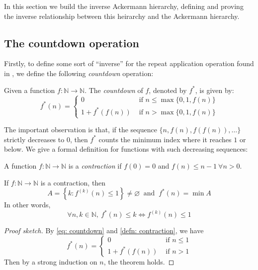 In this section we build the inverse Ackermann hierarchy, 
defining and proving the inverse relationship between 
this heirarchy and the Ackermann hierarchy.

\subsection{The countdown operation}

Firstly, to define some sort of ``inverse'' for the repeat 
application operation found in , we 
define the following \textit{countdown} operation:

\begin{defn} \label{defn: countdown}
Given a function $f: \mathbb{N} \to \mathbb{N}$. 
The \textit{countdown} of $f$, denoted by $f^*$, is given by:
\begin{equation} \label{eq: countdown}
f^*(n) = \begin{cases}
0 & \text{ if } n \le \max\{0, 1, f(n)\} \\ 1 + f^*(f(n)) & \text{ if } n > \max\{0, 1, f(n)\}
\end{cases}
\end{equation}
\end{defn}
The important observation is that, if the sequence 
$\{n, f(n), f(f(n)), \ldots\}$ strictly decreases to 
$0$, then $f^*$ counts the minimum index where it reaches 
$1$ or below. We give a formal definition for functions 
with such decreasing sequences:

\begin{defn} \label{defn: contraction}
A function $f: \mathbb{N} \to \mathbb{N}$ is a \textit{contraction} if $f(0) = 0$ and $f(n) \le n-1 \ \forall n > 0$.
\end{defn}

\begin{thm} \label{thm: countdown contraction}
If $f: \mathbb{N} \to \mathbb{N}$ is a contraction, then
\begin{equation*}
A = \left\{k: f^{(k)}(n) \le 1\right\} \neq \varnothing \ \text{ and } \ f^*(n) = \min A
\end{equation*}
In other words,
\begin{equation*}
\forall n, k\in \mathbb{N}, \ f^*(n) \le k \iff f^{(k)}(n) \le 1
\end{equation*}
\end{thm}

\begin{proof}[Proof sketch]
By \eqref{eq: countdown} and \cref{defn: contraction}, we have
\begin{equation*}
f^*(n) = \begin{cases}
0 & \text{ if } n \le 1 \\ 1 + f^*(f(n)) & \text{ if } n > 1
\end{cases}
\end{equation*}
Then by a strong induction on $n$, the theorem holds.
\end{proof}

